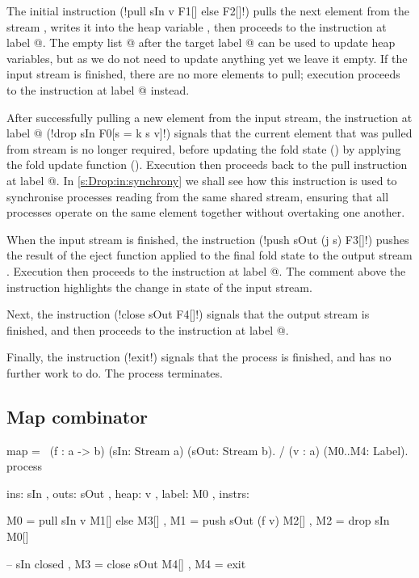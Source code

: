 The initial instruction (\lstiproc!pull sIn v F1[] else F2[]!) pulls the next element from the stream \lstiproc@sIn@, writes it into the heap variable \lstiproc@v@, then proceeds to the instruction at label @.
The empty list \lstiproc@[]@ after the target label @ can be used to update heap variables, but as we do not need to update anything yet we leave it empty. 
If the input stream is finished, there are no more elements to pull; execution proceeds to the instruction at label @ instead.

After successfully pulling a new element from the input stream, the instruction at label @ (\lstiproc!drop sIn F0[s = k s v]!) signals that the current element that was pulled from stream \lstiproc@sIn@ is no longer required, before updating the fold state (\lstiproc@s@) by applying the fold update function (\lstiproc@k@).
Execution then proceeds back to the pull instruction at label @.
In \cref{s:Drop:in:synchrony} we shall see how this \lstiproc@drop@ instruction is used to synchronise processes reading from the same shared stream, ensuring that all processes operate on the same element together without overtaking one another.

When the input stream is finished, the instruction (\lstiproc!push sOut (j s) F3[]!) pushes the result of the eject function applied to the final fold state to the output stream \lstiproc@sOut@.
Execution then proceeds to the instruction at label @.
The comment above the instruction highlights the change in state of the input stream.

Next, the instruction (\lstiproc!close sOut F4[]!) signals that the output stream \lstiproc@sOut@ is finished, and then proceeds to the instruction at label @.

Finally, the instruction (\lstiproc!exit!) signals that the process is finished, and has no further work to do.
The process terminates.

\subsection{Map combinator}

\begin{process}[float,caption=Process implementation of \Hs/map/,label=figs/procs/impl/map]
map 
  = \ (f  : a -> b)
      (sIn: Stream a) (sOut: Stream b). 
    / (v  : a)        (M0..M4: Label).
    process
     { ins:    { sIn  }
     , outs:   { sOut }
     , heap:   { v }
     , label:  M0
     , instrs: { M0 = pull  sIn     v  M1[] else M3[]
               , M1 = push  sOut (f v) M2[]
               , M2 = drop  sIn        M0[]

               -- sIn closed
               , M3 = close sOut       M4[]
               , M4 = exit } }
\end{process}


